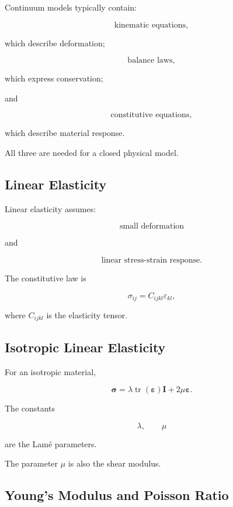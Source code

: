 Continuum models typically contain:

\[
\boxed{
\text{kinematic equations},
}
\]

which describe deformation;

\[
\boxed{
\text{balance laws},
}
\]

which express conservation;

and

\[
\boxed{
\text{constitutive equations},
}
\]

which describe material response.

All three are needed for a closed physical model.

\subsection{Linear Elasticity}
\label{subsec:linear-elasticity}

Linear elasticity assumes:

\[
\boxed{
\text{small deformation}
}
\]

and

\[
\boxed{
\text{linear stress-strain response}.
}
\]

The constitutive law is

\[
\boxed{
\sigma_{ij}
=
C_{ijkl}
\varepsilon_{kl},
}
\]

where \(C_{ijkl}\) is the elasticity tensor.

\subsection{Isotropic Linear Elasticity}
\label{subsec:isotropic-linear-elasticity}

For an isotropic material,

\[
\boxed{
\boldsymbol{\sigma}
=
\lambda
\operatorname{tr}
(\boldsymbol{\varepsilon})
\mathbf{I}
+
2\mu
\boldsymbol{\varepsilon}.
}
\]

The constants

\[
\lambda,
\qquad
\mu
\]

are the Lamé parameters.

The parameter \(\mu\) is also the shear modulus.

\subsection{Young's Modulus and Poisson Ratio}
\label{subsec:young-poisson}

